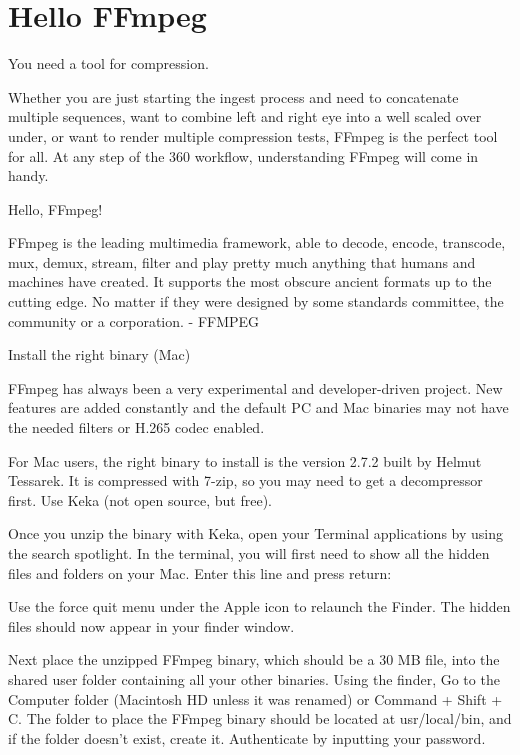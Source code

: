 \chapter{Hello FFmpeg}
\pagecolor{white}
\label{chap:56}
\begin{fullwidth}

\problem

{\large You need a tool for compression. \par}

Whether you are just starting the ingest process and need to concatenate multiple sequences, want to combine left and right eye into a well scaled over under, or want to render multiple compression tests, FFmpeg is the perfect tool for all. At any step of the 360 workflow, understanding FFmpeg will come in handy.

\solutions

{\large Hello, FFmpeg! \par}

FFmpeg is the leading multimedia framework, able to decode, encode, transcode, mux, demux, stream, filter and play pretty much anything that humans and machines have created. It supports the most obscure ancient formats up to the cutting edge. No matter if they were designed by some standards committee, the community or a corporation. - FFMPEG

{\large Install the right binary (Mac)\par}

FFmpeg has always been a very experimental and developer-driven project. New features are added constantly and the default PC and Mac binaries may not have the needed filters or H.265 codec enabled. 

For Mac users, the right binary to install is the version 2.7.2 built by Helmut Tessarek. It is compressed with 7-zip, so you may need to get a decompressor first. Use Keka (not open source, but free).

Once you unzip the binary with Keka, open your Terminal applications by using the search spotlight. In the terminal, you will first need to show all the hidden files and folders on your Mac. Enter this line and press return:


Use the force quit menu under the Apple icon to relaunch the Finder. The hidden files should now appear in your finder window. 

Next place the unzipped FFmpeg binary, which should be a 30 MB file, into the shared user folder containing all your other binaries. Using the finder, Go to the Computer folder (Macintosh HD unless it was renamed) or Command + Shift + C. The folder to place the FFmpeg binary should be located at usr/local/bin, and if the folder doesn’t exist, create it. Authenticate by inputting your password. 


\end{fullwidth}
